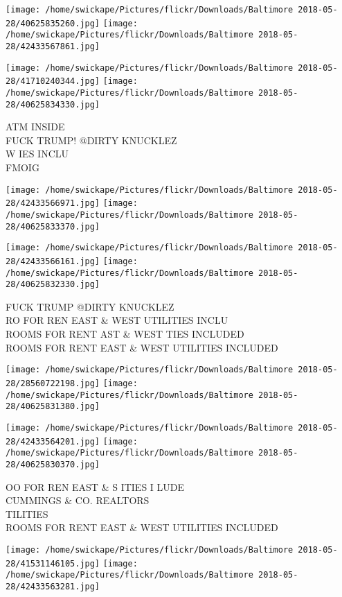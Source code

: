 \documentclass[10pt,letterpaper]{article}
\begin{document}
\texttt{[image: /home/swickape/Pictures/flickr/Downloads/Baltimore 2018-05-28/40625835260.jpg]}
\texttt{[image: /home/swickape/Pictures/flickr/Downloads/Baltimore 2018-05-28/42433567861.jpg]}

\texttt{[image: /home/swickape/Pictures/flickr/Downloads/Baltimore 2018-05-28/41710240344.jpg]}
\texttt{[image: /home/swickape/Pictures/flickr/Downloads/Baltimore 2018-05-28/40625834330.jpg]}

ATM INSIDE\\
FUCK TRUMP!  @DIRTY KNUCKLEZ\\
W IES INCLU\\
FMOIG
\pagebreak

\texttt{[image: /home/swickape/Pictures/flickr/Downloads/Baltimore 2018-05-28/42433566971.jpg]}
\texttt{[image: /home/swickape/Pictures/flickr/Downloads/Baltimore 2018-05-28/40625833370.jpg]}

\texttt{[image: /home/swickape/Pictures/flickr/Downloads/Baltimore 2018-05-28/42433566161.jpg]}
\texttt{[image: /home/swickape/Pictures/flickr/Downloads/Baltimore 2018-05-28/40625832330.jpg]}

FUCK TRUMP @DIRTY KNUCKLEZ\\
RO FOR REN EAST \& WEST UTILITIES INCLU\\
ROOMS FOR RENT AST \& WEST TIES INCLUDED\\
ROOMS FOR RENT EAST \& WEST UTILITIES INCLUDED
\pagebreak

\texttt{[image: /home/swickape/Pictures/flickr/Downloads/Baltimore 2018-05-28/28560722198.jpg]}
\texttt{[image: /home/swickape/Pictures/flickr/Downloads/Baltimore 2018-05-28/40625831380.jpg]}

\texttt{[image: /home/swickape/Pictures/flickr/Downloads/Baltimore 2018-05-28/42433564201.jpg]}
\texttt{[image: /home/swickape/Pictures/flickr/Downloads/Baltimore 2018-05-28/40625830370.jpg]}

OO FOR REN EAST \& S ITIES I LUDE\\
CUMMINGS \& CO. REALTORS\\
TILITIES\\
ROOMS FOR RENT EAST \& WEST UTILITIES INCLUDED
\pagebreak

\texttt{[image: /home/swickape/Pictures/flickr/Downloads/Baltimore 2018-05-28/41531146105.jpg]}
\texttt{[image: /home/swickape/Pictures/flickr/Downloads/Baltimore 2018-05-28/42433563281.jpg]}
\end{document}

